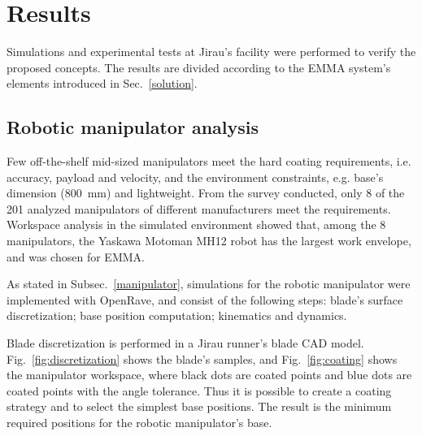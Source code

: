 \section{Results}



Simulations and experimental tests at Jirau's facility were performed to verify
the proposed concepts. The results are divided according to the EMMA system's
elements introduced in Sec.~\ref{solution}. 

\subsection{Robotic manipulator analysis}\label{sec::man_analysis}

Few off-the-shelf mid-sized manipulators meet the hard coating requirements,
i.e. accuracy, payload and velocity, and the environment constraints, e.g.
base's dimension (800~mm) and lightweight. From the survey conducted, only 8 of
the 201 analyzed manipulators of different manufacturers meet the requirements.
Workspace analysis in the simulated environment showed that, among the 8
manipulators, the Yaskawa Motoman MH12 robot has the largest work envelope, and
was chosen for EMMA.

As stated in Subsec.~\ref{manipulator}, simulations for the robotic
manipulator were implemented with OpenRave, and consist of the following steps:
blade's surface discretization; base position computation; kinematics
and dynamics.

Blade discretization is performed in a Jirau runner's blade CAD model.
Fig.~\ref{fig:discretization} shows the blade's samples, and
Fig.~\ref{fig:coating} shows the manipulator workspace, where black dots are
coated points and blue dots are coated points with the angle tolerance.
Thus it is possible to create a coating strategy and to select the simplest base
positions. The result is the minimum required positions for the robotic
manipulator's base.

